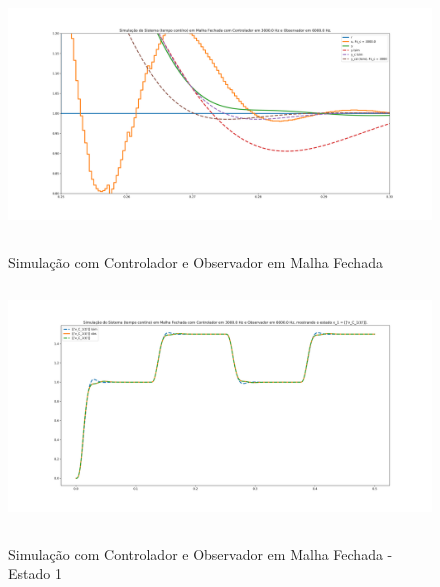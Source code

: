 \documentclass[
	12pt,				%
	article,			%
	openright,			%
	oneside,
	a4paper,			%
	chapter=TITLE,		%
	section=TITLE,		%
	english,			%
	french,				%
	spanish,			%
	brazil,				%
]{abntex2}
\begin{document}
\begin{apendicesenv}
        	\begin{figure}[htbp]
                	\centering
                	\caption{Simulação com Controlador e Observador em Malha Fechada}
                	\includegraphics[width=\textwidth,height=240px,keepaspectratio]{imgs/step_response_closedloop_observer_zoom_stepdown.png}
                	\label{fig-step_response_closedloop_observer_zoom_stepdown}
        	\end{figure}
            	
        	\begin{figure}[htbp]
            	\centering
            	\caption{Simulação com Controlador e Observador em Malha Fechada - Estado 1}
            	\includegraphics[width=\textwidth,height=240px,keepaspectratio]{imgs/step_response_closedloop_observer_state1.png}
            	\label{fig-step_response_closedloop_observer_state1}
        	\end{figure}
        	

\end{apendicesenv}
\end{document}

